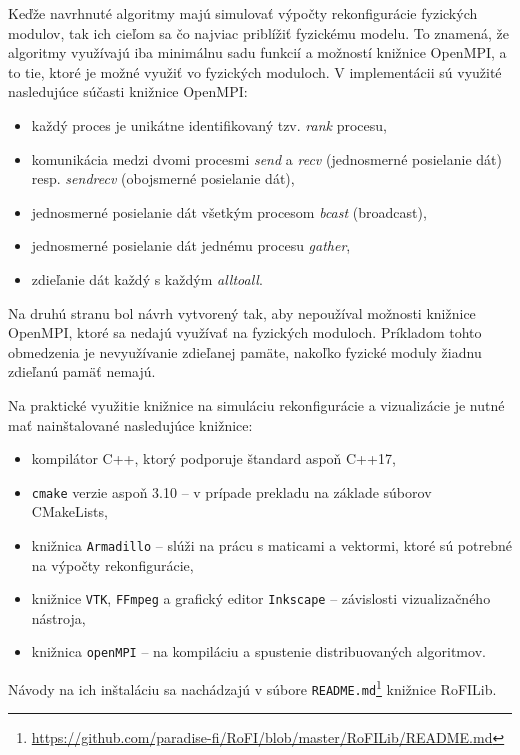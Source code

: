\documentclass[
  digital, %
  oneside, %
  notable,   %
  lof,     %
  nolot,     %
]{fithesis3}
\begin{document}
Keďže navrhnuté algoritmy majú simulovať výpočty rekonfigurácie fyzických modulov, tak ich cieľom sa čo najviac priblížiť fyzickému modelu. To znamená, že algoritmy využívajú iba minimálnu sadu funkcií a možností knižnice OpenMPI, a to tie, ktoré je možné využiť vo fyzických moduloch. V implementácii sú využité nasledujúce súčasti knižnice OpenMPI: 
\begin{itemize}
    \item každý proces je unikátne identifikovaný tzv. \textit{rank} procesu, 
    \item komunikácia medzi dvomi procesmi \textit{send} a \textit{recv} (jednosmerné posielanie dát) resp. \textit{sendrecv} (obojsmerné posielanie dát), 
    \item jednosmerné posielanie dát všetkým procesom \textit{bcast} (broadcast), 
    \item jednosmerné posielanie dát jednému procesu \textit{gather}, 
    \item zdieľanie dát každý s každým \textit{alltoall}. 
\end{itemize}

Na druhú stranu bol návrh vytvorený tak, aby nepoužíval možnosti knižnice OpenMPI, ktoré sa nedajú využívať na fyzických moduloch. Príkladom tohto obmedzenia je nevyužívanie zdieľanej pamäte, nakoľko fyzické moduly žiadnu zdieľanú pamäť nemajú. 

Na praktické využitie knižnice na simuláciu rekonfigurácie a vizualizácie je nutné mať nainštalované nasledujúce knižnice: 
\begin{itemize}
    \item kompilátor C++, ktorý podporuje štandard aspoň C++17, 
    \item \texttt{cmake} verzie aspoň 3.10 -- v prípade prekladu na základe súborov CMakeLists, 
    \item knižnica \texttt{Armadillo} -- slúži na prácu s maticami a vektormi, ktoré sú potrebné na výpočty rekonfigurácie,  
    \item knižnice \texttt{VTK}, \texttt{FFmpeg} a grafický editor \texttt{Inkscape} -- závislosti vizualizačného nástroja, 
    \item knižnica \texttt{openMPI} -- na kompiláciu a spustenie distribuovaných algoritmov. 
\end{itemize}

 Návody na ich inštaláciu sa nachádzajú v súbore \texttt{README.md}\footnote{\url{https://github.com/paradise-fi/RoFI/blob/master/RoFILib/README.md}} knižnice RoFILib. 
\end{document}
